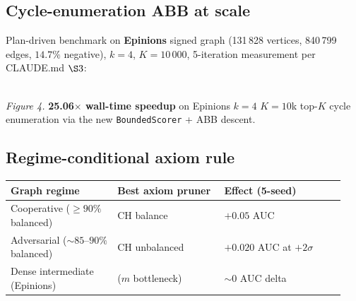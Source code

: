 \documentclass[11pt,a4paper]{article}
\newcommand{\code}[1]{\texttt{\small #1}}
\begin{document}
\subsection{Cycle-enumeration ABB at scale}

Plan-driven benchmark on \textbf{Epinions} signed graph (131\,828 vertices,
840\,799 edges, $14.7\%$ negative), $k=4$, $K=10\,000$, 5-iteration
measurement per CLAUDE.md $\S 3$:

\begin{center}
\\
\small\textit{Figure 4.} \textbf{25.06$\times$ wall-time speedup} on Epinions $k{=}4$ $K{=}10$k
top-$K$ cycle enumeration via the new \code{BoundedScorer} + ABB descent.
\end{center}

\subsection{Regime-conditional axiom rule}

\begin{center}\small
\begin{tabular}{p{0.30\linewidth} p{0.30\linewidth} p{0.34\linewidth}}
\toprule
Graph regime & Best axiom pruner & Effect (5-seed) \\
\midrule
Cooperative ($\geq 90\%$ balanced) & CH balance & $+0.05$ AUC \\
Adversarial ($\sim 85$--$90\%$ balanced) & CH unbalanced & $+0.020$ AUC at $+2\sigma$ \\
Dense intermediate (Epinions) & ($m$ bottleneck) & ${\sim}0$ AUC delta \\
\bottomrule
\end{tabular}
\end{center}
\end{document}
